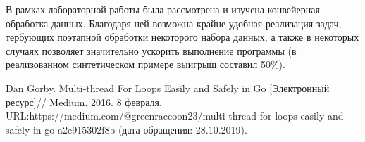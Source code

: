\documentclass[a4paper,12pt]{article}
\begin{document}
            В рамках лабораторной работы была рассмотрена и изучена конвейерная обработка данных. Благодаря ней возможна крайне удобная реализация задач, тербующих поэтапной обработки некоторого набора данных, а также в некоторых случаях позволяет значительно ускорить выполнение программы (в реализованном синтетическом примере выигрыш составил 50\%).
    \newpage


    \begin{center}        
        \begin{thebibliography}{}
        	  Dan Gorby. Multi-thread For Loops Easily and Safely in Go  [Электронный ресурс]//  Medium.  2016.  8 февраля.  URL:https://medium.com/@greenraccoon23/multi-thread-for-loops-easily-and-safely-in-go-a2e915302f8b (дата обращения: 28.10.2019).   	 	
        	
        \end{thebibliography}
    \end{center}
\end{document}
